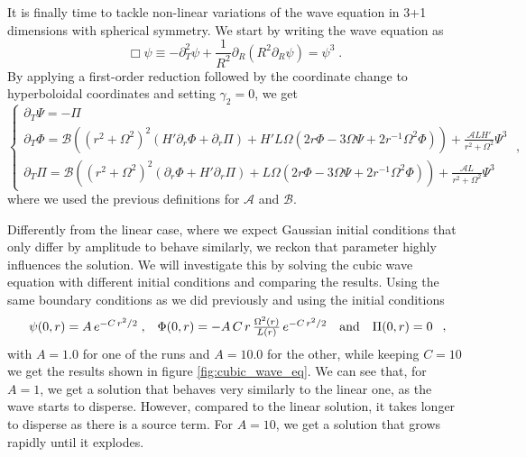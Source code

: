 It is finally time to tackle non-linear variations of the wave equation in 3+1 dimensions with spherical symmetry. We start by writing the wave equation as
%
\begin{equation}
    \Box \psi \equiv - \partial_T^2 \psi + \frac{1}{R^2} \partial_R\left( R^2 \partial_R \psi\right) = \psi^3 \;.
\end{equation}
%
By applying a first-order reduction followed by the coordinate change to hyperboloidal coordinates and setting $\gamma_2=0$, we get
%
\begin{equation}
    \left\{ \begin{array}{l} 
        \partial_T \Psi = - \Pi \\ 
        \partial_T \Phi = \mathcal{B}\left((r^2 + \Omega^2)^2 \left(H' \partial_r \Phi + \partial_r\Pi\right) + H' L \Omega \left( 2r\Phi - 3 \Omega \Psi + 2 r^{-1} \Omega^2 \Phi\right)\right) + \frac{\mathcal{A} L H'}{r^2 + \Omega^2} \Psi^3\\
        \partial_T \Pi = \mathcal{B}\left((r^2 + \Omega^2)^2 \left(\partial_r \Phi + H' \partial_r\Pi\right) + L \Omega \left( 2r\Phi - 3 \Omega \Psi + 2 r^{-1} \Omega^2 \Phi\right)\right) + \frac{\mathcal{A} L}{r^2 + \Omega^2} \Psi^3
        \end{array} \right. \; ,
\end{equation}
%
where we used the previous definitions for $\mathcal{A}$ and $\mathcal{B}$. 

Differently from the linear case, where we expect Gaussian initial conditions that only differ by amplitude to behave similarly, we reckon that parameter highly influences the solution. We will investigate this by solving the cubic wave equation with different initial conditions and comparing the results. Using the same boundary conditions as we did previously and using the initial conditions
%
\begin{equation}
    \begin{array}{c c c c}
        \psi(0,r) = A \, e^{-C \, r^2/2} \; , & \Phi(0,r) = - A \,C \, r \, \frac{\Omega^2(r)}{L(r)} \, e^{-C \, r^2/2} & \text{and} & \Pi(0,r) = 0
    \end{array} \; ,
    \label{eq:cubic_wave_equation-2nd_order_initial_conditions}
\end{equation}
%
with $A = 1.0$ for one of the runs and $A = 10.0$ for the other, while keeping $C = 10$ we get the results shown in figure \ref{fig:cubic_wave_eq}. We can see that, for $A = 1$, we get a solution that behaves very similarly to the linear one, as the wave starts to disperse. However, compared to the linear solution, it takes longer to disperse as there is a source term. For $A = 10$, we get a solution that grows rapidly until it explodes.

